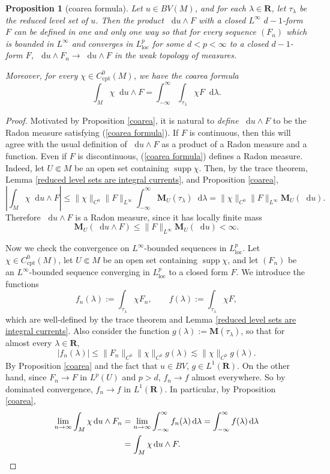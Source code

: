\documentclass[reqno,11pt]{amsart}
\newcommand{\RR}{\mathbf{R}}
\newcommand*\dif{\mathop{}\!\mathrm{d}}
\DeclareMathOperator{\supp}{supp}
\newcommand{\Mass}{\mathbf M}
\newcommand{\loc}{\mathrm{loc}}
\newcommand{\cpt}{\mathrm{cpt}}
\newtheorem{proposition}[theorem]{Proposition}
\theoremstyle{definition}
\numberwithin{equation}{section}
\begin{document}
\begin{proposition}[coarea formula]
Let $u \in BV(M)$, and for each $\lambda \in \RR$, let $\tau_\lambda$ be the reduced level set of $u$.
Then the product $\dif u \wedge F$ with a closed $L^\infty$ $d - 1$-form $F$ can be defined in one and only one way so that for every sequence $(F_n)$ which is bounded in $L^\infty$ and converges in $L^p_\loc$ for some $d < p < \infty$ to a closed $d - 1$-form $F$, $\dif u \wedge F_n \to \dif u \wedge F$ in the weak topology of measures.

Moreover, for every $\chi \in C^0_\cpt(M)$, we have the coarea formula
\begin{equation}\label{coarea formula}
\int_M \chi \dif u \wedge F = \int_{-\infty}^\infty \int_{\tau_\lambda} \chi F \dif \lambda.
\end{equation}
\end{proposition}
\begin{proof}
Motivated by Proposition \ref{coarea}, it is natural to \emph{define} $\dif u \wedge F$ to be the Radon measure satisfying (\ref{coarea formula}).
If $F$ is continuous, then this will agree with the usual definition of $\dif u \wedge F$ as a product of a Radon measure and a function.
Even if $F$ is discontinuous, (\ref{coarea formula}) defines a Radon measure.
Indeed, let $U \Subset M$ be an open set containing $\supp \chi$.
Then, by the trace theorem, Lemma \ref{reduced level sets are integral currents}, and Proposition \ref{coarea},
$$\left|\int_M \chi \dif u \wedge F\right| \leq \|\chi\|_{C^0} \|F\|_{L^\infty} \int_{-\infty}^\infty \Mass_U(\tau_\lambda) \dif \lambda = \|\chi\|_{C^0} \|F\|_{L^\infty} \Mass_U(\dif u).$$
Therefore $\dif u \wedge F$ is a Radon measure, since it has locally finite mass
$$\Mass_U(\dif u \wedge F) \leq \|F\|_{L^\infty} \Mass_U(\dif u) < \infty.$$

Now we check the convergence on $L^\infty$-bounded sequences in $L^p_\loc$.
Let $\chi \in C^0_\cpt(M)$, let $U \Subset M$ be an open set containing $\supp \chi$, and let $(F_n)$ be an $L^\infty$-bounded sequence converging in $L^p_\loc$ to a closed form $F$.
We introduce the functions
$$f_n(\lambda) := \int_{\tau_\lambda} \chi F_n, \qquad f(\lambda) := \int_{\tau_\lambda} \chi F,$$
which are well-defined by the trace theorem and Lemma \ref{reduced level sets are integral currents}.
Also consider the function $g(\lambda) := \Mass(\tau_\lambda)$, so that for almost every $\lambda \in \RR$, 
$$|f_n(\lambda)| \leq \|F_n\|_{C^0} \|\chi\|_{C^0} g(\lambda) \lesssim \|\chi\|_{C^0} g(\lambda).$$
By Proposition \ref{coarea} and the fact that $u \in BV$, $g \in L^1(\RR)$.
On the other hand, since $F_n \to F$ in $L^p(U)$ and $p > d$, $f_n \to f$ almost everywhere.
So by dominated convergence, $f_n \to f$ in $L^1(\RR)$.
In particular, by Proposition \ref{coarea},
\begin{align*}
\lim_{n \to \infty} \int_M \chi \dif u \wedge F_n
&= \lim_{n \to \infty} \int_{-\infty}^\infty f_n(\lambda) \dif \lambda
= \int_{-\infty}^\infty f(\lambda) \dif \lambda \\
&= \int_M \chi \dif u \wedge F. \qedhere 
\end{align*}
\end{proof}
\end{document}
